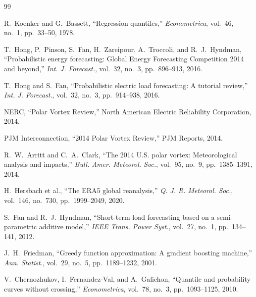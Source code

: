 \documentclass[12pt,a4paper]{article}
\begin{document}
\begin{thebibliography}{99}


 R.~Koenker and G.~Bassett, ``Regression quantiles,'' \textit{Econometrica}, vol.~46, no.~1, pp.~33--50, 1978.

 T.~Hong, P.~Pinson, S.~Fan, H.~Zareipour, A.~Troccoli, and R.~J.~Hyndman, ``Probabilistic energy forecasting: Global Energy Forecasting Competition 2014 and beyond,'' \textit{Int. J. Forecast.}, vol.~32, no.~3, pp.~896--913, 2016.

 T.~Hong and S.~Fan, ``Probabilistic electric load forecasting: A tutorial review,'' \textit{Int. J. Forecast.}, vol.~32, no.~3, pp.~914--938, 2016.

 NERC, ``Polar Vortex Review,'' North American Electric Reliability Corporation, 2014.

 PJM Interconnection, ``2014 Polar Vortex Review,'' PJM Reports, 2014.

 R.~W.~Arritt and C.~A.~Clark, ``The 2014 U.S. polar vortex: Meteorological analysis and impacts,'' \textit{Bull. Amer. Meteorol. Soc.}, vol.~95, no.~9, pp.~1385--1391, 2014.

 H.~Hersbach et al., ``The ERA5 global reanalysis,'' \textit{Q. J. R. Meteorol. Soc.}, vol.~146, no.~730, pp.~1999--2049, 2020.


S.~Fan and R.~J.~Hyndman, ``Short-term load forecasting based on a semi-parametric additive model,'' \textit{IEEE Trans. Power Syst.}, vol.~27, no.~1, pp.~134--141, 2012.

J.~H.~Friedman, ``Greedy function approximation: A gradient boosting machine,'' \textit{Ann. Statist.}, vol.~29, no.~5, pp.~1189--1232, 2001.

V.~Chernozhukov, I.~Fernandez-Val, and A.~Galichon, ``Quantile and probability curves without crossing,'' \textit{Econometrica}, vol.~78, no.~3, pp.~1093--1125, 2010.

\end{thebibliography}
\end{document}
